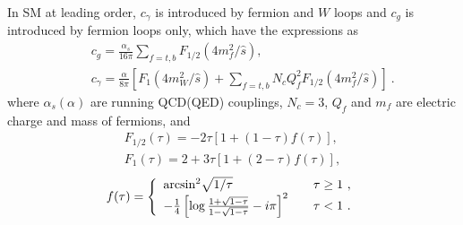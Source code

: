 \documentclass[twocolumn,
prd,amssymb,amsmath,preprintnumbers,
floatfix,aps,nofootinbib]{revtex4-1}
\newcommand{\beq}{\begin{equation}}
\newcommand{\eeq}{\end{equation}}
\newcommand{\bea}{\begin{eqnarray}}
\newcommand{\eea}{\end{eqnarray}}
\begin{document}
In SM at leading order, $c_\gamma$ is introduced by fermion and $W$ loops and $c_g$ is introduced by fermion loops only, which have the expressions as
\bea
&&c_g =\frac{\alpha_s}{16\pi }\sum_{f=t,b}F_{1/2}(4m^2_f/\hat{s}), \\
&&c_\gamma =\frac{\alpha}{8\pi }\left[F_1(4m^2_W/\hat{s})
+\sum_{f=t,b}N_c Q^2_f F_{1/2}(4m^2_f/\hat{s}) \right ]~.
\eea
where $\alpha_s(\alpha)$ are running QCD(QED) couplings, $N_c=3$, $Q_f$ and $m_f$ are electric charge and mass of fermions, and
\bea
F_{1/2}(\tau) = -2\tau[1+(1-\tau)f(\tau)], \\
F_1(\tau) = 2+3\tau[1+(2-\tau)f(\tau)],
\eea
\beq
f(\tau) = \left\{
\begin{array}{ll}
{\rm arcsin}^2 \sqrt{1/\tau} & \tau \geq 1~, \\
-\frac{1}{4} \left[ \log \frac{1 + \sqrt{1-\tau } }
{1 - \sqrt{1-\tau} } - i \pi \right]^2 \ \ \ & \tau <1~.
\end{array} \right.
\eeq
\end{document}
